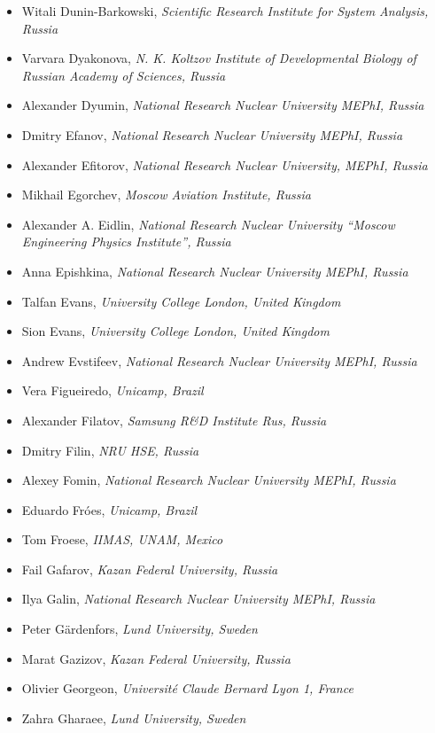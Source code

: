 \documentclass[10pt,fleqn,openany]{book} %
\begin{document}
\begin{itemize}
		\item Witali Dunin-Barkowski, \textit{Scientific Research Institute for System Analysis, Russia}
		\item Varvara Dyakonova, \textit{N. K. Koltzov Institute of Developmental Biology of Russian Academy of Sciences, Russia}
		\item Alexander Dyumin, \textit{National Research Nuclear University MEPhI, Russia}
		\item Dmitry Efanov, \textit{National Research Nuclear University MEPhI, Russia}
		\item Alexander Efitorov, \textit{National Research Nuclear University, MEPhI, Russia}
		\item Mikhail Egorchev, \textit{Moscow Aviation Institute, Russia}
		\item Alexander A. Eidlin, \textit{National Research Nuclear University ``Moscow Engineering Physics Institute'', Russia}
		\item Anna Epishkina, \textit{National Research Nuclear University MEPhI, Russia}
		\item Talfan Evans, \textit{University College London, United Kingdom}
		\item Sion Evans, \textit{University College London, United Kingdom}
		\item Andrew Evstifeev, \textit{National Research Nuclear University MEPhI, Russia}
		\item Vera Figueiredo, \textit{Unicamp, Brazil}
		\item Alexander Filatov, \textit{Samsung R\&D Institute Rus, Russia}
		\item Dmitry Filin, \textit{NRU HSE, Russia}
		\item Alexey Fomin, \textit{National Research Nuclear University MEPhI, Russia}
		\item Eduardo Fróes, \textit{Unicamp, Brazil}
		\item Tom Froese, \textit{IIMAS, UNAM, Mexico}
		\item Fail Gafarov, \textit{Kazan Federal University, Russia}
		\item Ilya Galin, \textit{National Research Nuclear University MEPhI, Russia}
		\item Peter Gärdenfors, \textit{Lund University, Sweden}
		\item Marat Gazizov, \textit{Kazan Federal University, Russia}
		\item Olivier Georgeon, \textit{Université Claude Bernard Lyon 1, France}
		\item Zahra Gharaee, \textit{Lund University, Sweden}

\end{itemize}
\end{document}

